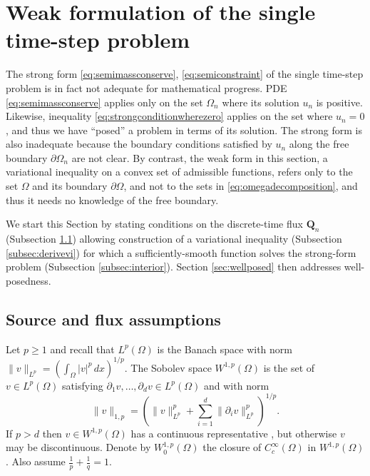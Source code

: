 \documentclass[final,onefignum]{siamart190516}
\newcommand\bQ{\mathbf{Q}}
\begin{document}
\section{Weak formulation of the single time-step problem}  \label{sec:weakform}

The strong form \eqref{eq:semimassconserve}, \eqref{eq:semiconstraint} of the single time-step problem is in fact not adequate for mathematical progress.  PDE \eqref{eq:semimassconserve} applies only on the set $\Omega_n$ where its solution $u_n$ is positive.  Likewise, inequality \eqref{eq:strongconditionwherezero} applies on the set where $u_n=0$, and thus we have ``posed'' a problem in terms of its solution.  The strong form is also inadequate because the boundary conditions satisfied by $u_n$ along the free boundary $\partial\Omega_n$ are not clear.  By contrast, the weak form in this section, a variational inequality \cite{Friedman1982,KinderlehrerStampacchia1980} on a convex set of admissible functions, refers only to the set $\Omega$ and its boundary $\partial\Omega$, and not to the sets in \eqref{eq:omegadecomposition}, and thus it needs no knowledge of the free boundary.

We start this Section by stating conditions on the discrete-time flux $\bQ_n$ (Subsection \ref{subsec:fluxassumptions}) allowing construction of a variational inequality (Subsection \ref{subsec:derivevi}) for which a sufficiently-smooth function solves the strong-form problem (Subsection \ref{subsec:interior}).  Section \ref{sec:wellposed} then addresses well-posedness.

\subsection{Source and flux assumptions} \label{subsec:fluxassumptions}  Let $p\ge 1$ and recall that $L^p (\Omega)$ is the Banach space with norm $\|v\|_{L^p} = \left(\int_\Omega |v|^p\,dx\right)^{1/p}$.  The Sobolev space $W^{1,p}(\Omega)$ \cite{Evans2010} is the set of $v \in L^p(\Omega)$ satisfying $\partial_1 v,\dots,\partial_d v \in L^p(\Omega)$ and with norm
\begin{equation}
  \|v\|_{1,p} = \left(\|v\|_{L^p}^p + \sum_{i=1}^d \|\partial_i v\|_{L^p}^p\right)^{1/p}.  \label{eq:norm}
\end{equation}
If $p>d$ then $v\in W^{1,p}(\Omega)$ has a continuous representative \cite[``Morrey's inequality'']{Evans2010}, but otherwise $v$ may be discontinuous.  Denote by $W_0^{1,p}(\Omega)$ the closure of $C_c^\infty(\Omega)$ in $W^{1,p}(\Omega)$.  Also assume $\frac{1}{p}+\frac{1}{q}=1$.
\end{document}
